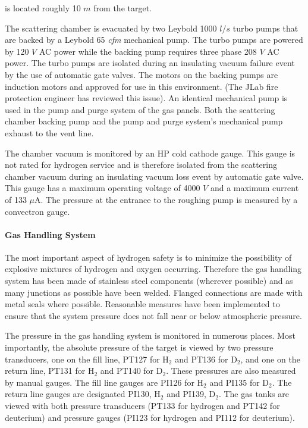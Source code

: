 \begin{safetyen}{0}{0}
{\begin{description}
  is located roughly 10 $m$ from the target.
\item [{\bf Vacuum Pumps}] The scattering chamber is evacuated by two
  Leybold 1000 $l/s$ turbo pumps that are backed by a Leybold 65
  \emph{cfm} mechanical pump. The turbo pumps are powered by 120 $V$
  AC power while the backing pump requires three phase 208 $V$ AC
  power. The turbo pumps are isolated during an insulating vacuum
  failure event by the use of automatic gate valves. The motors on the
  backing pumps are induction motors and approved for use in this
  environment. (The JLab fire protection engineer has reviewed this
  issue). An identical mechanical pump is used in the pump and purge
  system of the gas panels.  Both the scattering chamber backing pump
  and the pump and purge system's mechanical pump exhaust to the vent
  line.
\item [{\bf Vacuum Gauges}] The chamber vacuum is monitored by an HP
  cold cathode gauge. This gauge is not rated for hydrogen service and
  is therefore isolated from the scattering chamber vacuum during an
  insulating vacuum loss event by automatic gate valve. This gauge has
  a maximum operating voltage of 4000 $V$ and a maximum current of 133
  $\mu$A.  The pressure at the entrance to the roughing pump is
  measured by a convectron gauge.
\end{description}
}




\paragraph{Gas Handling System}

The most important aspect of hydrogen safety is to minimize the possibility
of explosive mixtures of hydrogen and oxygen occurring. Therefore
the gas handling system has been made of stainless steel components
(wherever possible) and as many junctions as possible have been welded.
Flanged connections are made with metal seals where possible. Reasonable
measures have been implemented to ensure that the system pressure
does not fall near or below atmospheric pressure.

The pressure in the gas handling system is monitored in numerous places.
Most importantly, the absolute pressure of the target is viewed by
two pressure transducers, one on the fill line, PT127 for H$_{2}$
and PT136 for D$_{2}$, and one on the return line, PT131 for H$_{2}$
and PT140 for D$_{2}$. These pressures are also measured by manual
gauges. The fill line gauges are PI126 for H$_{2}$ and PI135 for
D$_{2}$. The return line gauges are designated PI130, H$_{2}$ and
PI139, D$_{2}$. The gas tanks are viewed with both pressure transducers
(PT133 for hydrogen and PT142 for deuterium) and pressure gauges (PI123
for hydrogen and PI112 for deuterium).


\end{safetyen}

